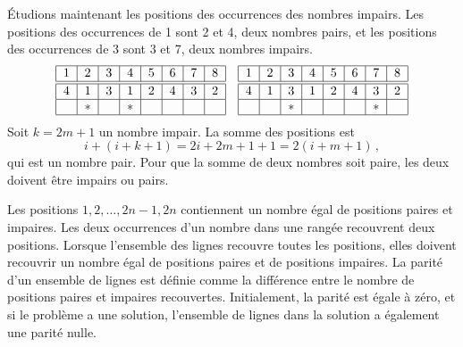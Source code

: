 \'Etudions maintenant les positions des occurrences des nombres impairs. Les positions des occurrences de 1 sont 2 et 4, deux nombres pairs, et les positions des occurrences de 3 sont 3 et 7, deux nombres impairs.
\[
\addtolength{\arraycolsep}{1pt}
\begin{array}{|c|c|c|c|c|c|c|c|}
\hline
1&2&3&4&5&6&7&8\\
\hline\hline
4&1&3&1&2&4&3&2\\\hline
&*&&*&&&&\\\hline
\end{array}
\hspace{1em}
\begin{array}{|c|c|c|c|c|c|c|c|}
\hline
1&2&3&4&5&6&7&8\\
\hline\hline
4&1&3&1&2&4&3&2\\\hline
&&*&&&&*&\\\hline
\end{array}
\]
Soit $k=2m+1$ un nombre impair. La somme des positions est 
\[
i+(i+k+1)=2i+2m+1+1=2(i+m+1)\,,
\]
qui est un nombre pair. Pour que la somme de deux nombres soit paire, les deux doivent être impairs ou pairs.

Les positions $1,2,\ldots,2n-1,2n$ contiennent un nombre égal de positions paires et impaires. Les deux occurrences d'un nombre dans une rangée \og recouvrent\fg{} deux positions. Lorsque l'ensemble des lignes recouvre toutes les positions, elles doivent recouvrir un nombre égal de positions paires et de positions impaires. La parité d'un ensemble de lignes est définie comme la différence entre le nombre de positions paires et impaires recouvertes. Initialement, la parité est égale à zéro, et si le problème a une solution, l'ensemble de lignes dans la solution a également une parité nulle.

